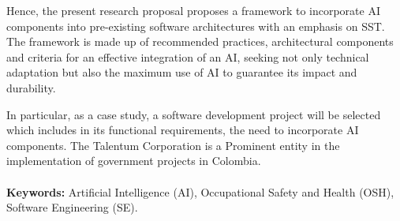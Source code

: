 Hence, the present research proposal proposes a framework to incorporate AI components into pre-existing software architectures with an emphasis on SST. The framework is made up of recommended practices, architectural components and criteria for an effective integration of an AI, seeking not only technical adaptation but also the maximum use of AI to guarantee its impact and durability.

In particular, as a case study, a software development project will be selected which includes in its functional requirements, the need to incorporate AI components. The Talentum Corporation is a
Prominent entity in the implementation of government projects in
Colombia.





\paragraph*{}{\textbf{Keywords:}}
Artificial Intelligence (AI), Occupational Safety and Health (OSH), Software Engineering (SE).